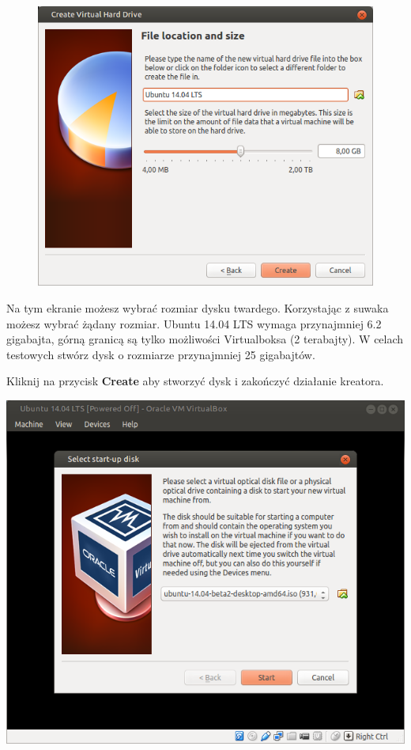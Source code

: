 \begin{figure}
                \includegraphics[width=\linewidth]{images/virtualbox_wizard6.png}
\end{figure}
Na tym ekranie możesz wybrać rozmiar dysku twardego. Korzystając z suwaka możesz wybrać żądany rozmiar. Ubuntu 14.04 LTS wymaga przynajmniej 6.2 gigabajta, górną granicą są tylko możliwości Virtualboksa (2 terabajty). W celach testowych stwórz dysk o rozmiarze przynajmniej 25 gigabajtów.
\begin{flushright}
Kliknij na przycisk \textbf{Create} aby stworzyć dysk i zakończyć działanie kreatora.
\end{flushright}
\clearpage
\begin{center}
\includegraphics[scale=1]{images/virtualbox_start.png}
\end{center}
